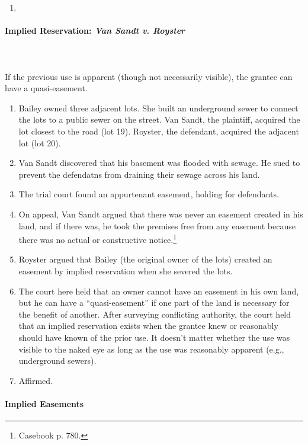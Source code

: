 \begin{enumerate}
    \item %
\end{enumerate}

\paragraph{Implied Reservation: \emph{Van Sandt v. Royster}}
~\\\\
If the previous use is apparent (though not necessarily visible), the grantee 
can have a quasi-easement.

\begin{enumerate}
    \item Bailey owned three adjacent lots. She built an underground sewer to 
    connect the lots to a public sewer on the street. Van Sandt, the 
    plaintiff, acquired the lot closest to the road (lot 19). Royster, the 
    defendant, acquired the adjacent lot (lot 20).
    \item Van Sandt discovered that his basement was flooded with sewage. He 
    sued to prevent the defendatns from draining their sewage across his land.
    \item The trial court found an appurtenant easement, holding for 
    defendants.
    \item On appeal, Van Sandt argued that there was never an easement 
    created in his land, and if there was, he took the premises free from any 
    easement because there was no actual or constructive 
    notice.\footnote{Casebook p. 780.}
    \item Royster argued that Bailey (the original owner of the lots) created 
    an easement by implied reservation when she severed the lots.
    \item The court here held that an owner cannot have an easement in his 
    own land, but he can have a ``quasi-easement'' if one part of the land is 
    necessary for the benefit of another. After surveying conflicting 
    authority, the court held that an implied reservation exists when the 
    grantee knew or reasonably should have known of the prior use. It doesn't 
    matter whether the use was visible to the naked eye as long as the use was 
    reasonably apparent (e.g., underground sewers).
    \item Affirmed.
\end{enumerate}

\paragraph{Implied Easements}

